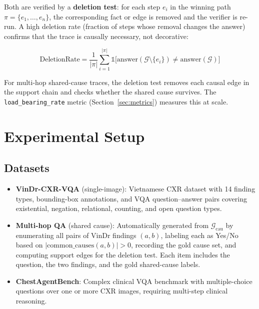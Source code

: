 \documentclass[runningheads]{llncs}
\begin{document}
Both are verified by a \textbf{deletion test}: for each step $e_i$ in the
winning path $\pi = \{e_1, \ldots, e_n\}$, the corresponding fact or edge
is removed and the verifier is re-run.
A high deletion rate (fraction of steps whose removal changes the answer)
confirms that the trace is causally necessary, not decorative:

\begin{equation}
  \text{DeletionRate} = \frac{1}{|\pi|} \sum_{i=1}^{|\pi|}
    \mathbb{1}\bigl[
      \text{answer}(\mathcal{G} \setminus \{e_i\}) \neq
      \text{answer}(\mathcal{G})
    \bigr]
  \label{eq:deletion}
\end{equation}

\noindent
For multi-hop shared-cause traces, the deletion test removes each causal
edge in the support chain and checks whether the shared cause survives.
The \texttt{load\_bearing\_rate} metric (Section~\ref{sec:metrics}) measures
this at scale.

\section{Experimental Setup}
\label{sec:experiments}

\subsection{Datasets}

\begin{itemize}
  \item \textbf{VinDr-CXR-VQA} (single-image): Vietnamese CXR dataset with
    14 finding types, bounding-box annotations, and VQA question--answer
    pairs covering existential, negation, relational, counting, and open
    question types.
  \item \textbf{Multi-hop QA} (shared cause): Automatically generated from
    $\mathcal{G}_{\text{cau}}$ by enumerating all pairs of VinDr findings
    $(a, b)$, labeling each as Yes/No based on
    $|\text{common\_causes}(a, b)| > 0$, recording the gold cause set, and
    computing support edges for the deletion test. Each item includes the
    question, the two findings, and the gold shared-cause labels.
  \item \textbf{ChestAgentBench}: Complex clinical VQA benchmark with
    multiple-choice questions over one or more CXR images, requiring
    multi-step clinical reasoning.
\end{itemize}
\end{document}
